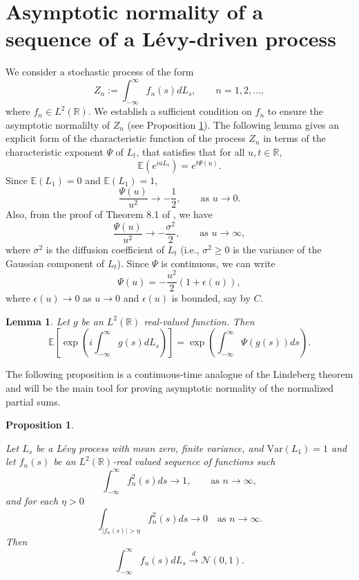 \documentclass[preprint,12pt]{article}
\newtheorem{prop}{Proposition}
\newtheorem{lem}{Lemma}
\begin{document}
\section{Asymptotic normality of a sequence of a L\'evy-driven process}\label{lindeberg2}
We consider a stochastic process of the form
$$
Z_n:=\int_{-\infty}^\infty f_n(s)dL_s,\qquad n=1,2,\ldots,
$$
where $f_n\in L^2(\mathbb{R}).$ We establish a sufficient condition on $f_n$ to ensure the asymptotic normalilty of $Z_n$ (see Proposition \ref{lindeberg1}). The following lemma gives an explicit form of the characteristic function of the process $Z_n$ in terms of the characteristic 
 exponent $\Psi$ of $L_t$,   that satisfies that  for all $u,t\in\mathbb{R}$,
$$
\mathbb{E}\left(e^{iuL_t}\right)
=
e^{t\Psi(u)}. 
$$
Since $\mathbb{E}(L_1)=0$ and $\mathbb{E}(L_1)=1$, 
$$
\frac{\Psi(u)}{u^2}\to-\frac{1}{2},\qquad\textrm{as }u\to0.
$$
Also, from the proof of Theorem 8.1 of \cite{Sato1999}, we have
$$
\frac{\Psi(u)}{u^2}\to-\frac{\sigma^2}{2},\qquad\textrm{as }u\to\infty,
$$
where $\sigma^2$ is the diffusion coefficient of $L_t$ (i.e., $\sigma^2\ge0$ is  the variance of the Gaussian component of $L_t$). Since $\Psi$ is continuous, we can write
$$
\Psi(u)
=
-\frac{u^2}{2}\left(1+\epsilon(u)\right),
$$
where $\epsilon(u)\to0$ as $u\to0$ and $\epsilon(u)$ is bounded, say by $C$.
\begin{lem}\label{representation}
Let $g$ be an $L^2(\mathbb{R})$ real-valued function. Then
$$
\mathbb{E}\left[\exp\left(i\int_{-\infty}^\infty g(s)dL_s\right)\right]=\exp\left(\int_{-\infty}^\infty\Psi(g(s))ds\right).
$$
\end{lem}
The following proposition is a continuous-time analogue of the Lindeberg theorem  and will be the main tool for proving asymptotic normality of the normalized partial sums.
\begin{prop}\label{lindeberg1}

Let $L_s$ be a L\'evy process with mean zero, finite variance, and $\textrm{Var}(L_1)=1$ and let $f_n(s)$ be an $L^2(\mathbb{R})$-real valued  sequence of functions such
$$
\int_{-\infty}^\infty f_n^2(s)ds\to1,\qquad\textrm{as }n\to\infty,
$$
and  for each $\eta>0$
$$
\int_{\vert f_n(s)\vert>\eta}f_n^2(s)ds\to0\quad\textrm{as }n\to\infty.
$$
Then
\begin{equation}\label{normality}
\int_{-\infty}^\infty f_n(s)dL_s\overset{d}{\longrightarrow}\mathcal{N}(0,1).
\end{equation}
\end{prop}
\end{document}
